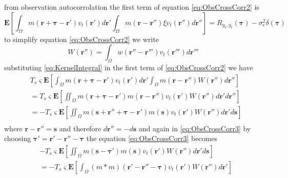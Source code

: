 \documentclass[]{article}
\begin{document}
from observation autocorrolation the first term of equation \eqref{eq:ObsCrossCorr2} is 
\begin{equation}
 \mathbf E \left[\int_{\Omega} m\left(\mathbf r + \boldsymbol \tau - \mathbf r'\right) v_t\left(\mathbf r'\right) d\mathbf r'\int_{\Omega}m\left(\mathbf r- \mathbf r''\right)\xi v_t\left(\mathbf r''\right)d\mathbf r''\right]=R_{y_{t},y_{t}}(\boldsymbol{\tau}) -\sigma_{\epsilon}^2\delta(\boldsymbol\tau)
\end{equation}
to simplify equation \eqref{eq:ObsCrossCorr2} we write
\begin{equation}\label{eq:KernelIntegral}
 W(\mathbf r'')=\int_{\Omega}w\left(\mathbf r''-\mathbf r'''\right)v_t\left(\mathbf r'''\right)d\mathbf r'''
\end{equation}
substituting \eqref{eq:KernelIntegral} in the first term of \eqref{eq:ObsCrossCorr2} we have
\begin{align}
 &T_s \varsigma\mathbf E \left[\int_{\Omega} m\left(\mathbf r + \boldsymbol \tau - \mathbf r'\right) v_t\left(\mathbf r'\right) d\mathbf r'\int_{\Omega}m\left(\mathbf r- \mathbf r''\right)  W(\mathbf r'') d\mathbf r''\right]\nonumber\\
&=T_s \varsigma\mathbf E \left[\iint_{\Omega} m\left(\mathbf r + \boldsymbol \tau - \mathbf r'\right)m\left(\mathbf r- \mathbf r''\right) v_t\left(\mathbf r'\right)  W(\mathbf r'') d\mathbf r'  d\mathbf r''\right]\nonumber\\
&=-T_s \varsigma\mathbf E \left[\iint_{\Omega} m\left(\mathbf s+\mathbf r'' + \boldsymbol \tau - \mathbf r'\right)m\left(\mathbf s\right) v_t\left(\mathbf r'\right)  W(\mathbf r'') d\mathbf r'  d\mathbf s\right]\nonumber\\ \label{eq:ObsCrossCorr3}
\end{align}
where $\mathbf r -\mathbf r''=\mathbf s $ and therefore $d \mathbf r''=-d\mathbf s $ and again in \eqref{eq:ObsCrossCorr3} by choosing $\boldsymbol\tau'=\mathbf r' -\mathbf r''-\boldsymbol\tau$ the equation \eqref{eq:ObsCrossCorr3} becomes
\begin{align}
 &-T_s \varsigma\mathbf E \left[\iint_{\Omega} m\left(\mathbf s-\boldsymbol \tau'\right)m\left(\mathbf s\right) v_t\left(\mathbf r'\right)  W(\mathbf r'') d\mathbf r'  d\mathbf s\right]\nonumber\\ 
&=-T_s \varsigma\mathbf E \left[\int_{\Omega} (m \ast m)\left(\mathbf r'-\mathbf r''-\boldsymbol \tau\right)v_t\left(\mathbf r'\right)  W(\mathbf r'') d\mathbf r'\right]\label{eq:ObsCrossCorr4}
\end{align}
\end{document}
